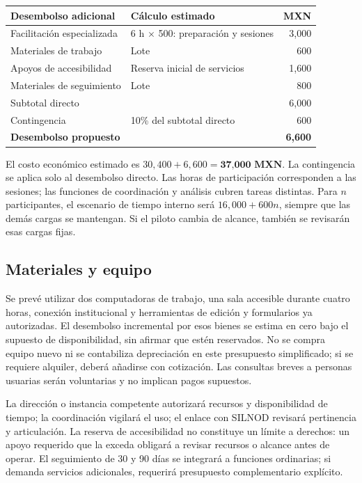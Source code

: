 \documentclass[12pt,letterpaper,oneside]{article}
\begin{document}
\begin{longtable}{@{}L{.43\textwidth}L{.30\textwidth}r@{}}
\toprule \textbf{Desembolso adicional} & \textbf{Cálculo estimado} & \textbf{MXN} \\
\midrule\endhead
Facilitación especializada & 6 h $\times$ 500: preparación y sesiones & 3,000 \\
Materiales de trabajo & Lote & 600 \\
Apoyos de accesibilidad & Reserva inicial de servicios & 1,600 \\
Materiales de seguimiento & Lote & 800 \\
\midrule Subtotal directo & & 6,000 \\
Contingencia & 10\% del subtotal directo & 600 \\
\textbf{Desembolso propuesto} & & \textbf{6,600} \\
\bottomrule
\end{longtable}
El costo económico estimado es $30{,}400+6{,}600=\textbf{37,000 MXN}$. La contingencia se aplica solo al desembolso directo. Las horas de participación corresponden a las sesiones; las funciones de coordinación y análisis cubren tareas distintas. Para $n$ participantes, el escenario de tiempo interno será $16{,}000+600n$, siempre que las demás cargas se mantengan. Si el piloto cambia de alcance, también se revisarán esas cargas fijas.

\subsection{Materiales y equipo}
Se prevé utilizar dos computadoras de trabajo, una sala accesible durante cuatro horas, conexión institucional y herramientas de edición y formularios ya autorizadas. El desembolso incremental por esos bienes se estima en cero bajo el supuesto de disponibilidad, sin afirmar que estén reservados. No se compra equipo nuevo ni se contabiliza depreciación en este presupuesto simplificado; si se requiere alquiler, deberá añadirse con cotización. Las consultas breves a personas usuarias serán voluntarias y no implican pagos supuestos.

La dirección o instancia competente autorizará recursos y disponibilidad de tiempo; la coordinación vigilará el uso; el enlace con SILNOD revisará pertinencia y articulación. La reserva de accesibilidad no constituye un límite a derechos: un apoyo requerido que la exceda obligará a revisar recursos o alcance antes de operar. El seguimiento de 30 y 90 días se integrará a funciones ordinarias; si demanda servicios adicionales, requerirá presupuesto complementario explícito.
\end{document}

